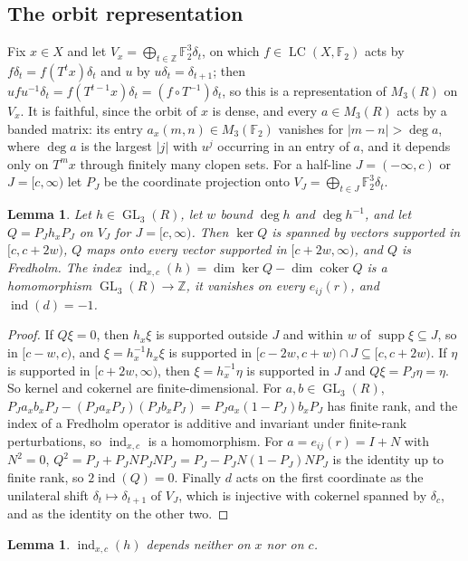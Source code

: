 \documentclass[11pt]{amsart}
\newtheorem{lemma}[theorem]{Lemma}
\theoremstyle{remark}
\newcommand{\F}{\mathbb F}
\newcommand{\Z}{\mathbb Z}
\newcommand{\LC}{\operatorname{LC}}
\newcommand{\GL}{\operatorname{GL}}
\newcommand{\ind}{\operatorname{ind}}
\newcommand{\supp}{\operatorname{supp}}
\begin{document}
\subsection*{The orbit representation}
Fix $x\in X$ and let $V_x=\bigoplus_{t\in\Z}\F_2^3\delta_t$, on which
$f\in\LC(X,\F_2)$ acts by $f\delta_t=f(T^tx)\delta_t$ and $u$ by
$u\delta_t=\delta_{t+1}$; then $ufu^{-1}\delta_t=f(T^{t-1}x)\delta_t
=(f\circ T^{-1})\delta_t$, so this is a representation of $M_3(R)$ on
$V_x$. It is faithful, since the orbit of $x$ is dense, and every
$a\in M_3(R)$ acts by a banded matrix: its entry $a_x(m,n)\in M_3(\F_2)$
vanishes for $|m-n|>\deg a$, where $\deg a$ is the largest $|j|$ with
$u^j$ occurring in an entry of $a$, and it depends only on $T^mx$ through
finitely many clopen sets. For a half-line $J=(-\infty,c)$ or $J=[c,\infty)$
let $P_J$ be the coordinate projection onto $V_J=\bigoplus_{t\in J}\F_2^3\delta_t$.

\begin{lemma}\label{lem:fredholm}
Let $h\in\GL_3(R)$, let $w$ bound $\deg h$ and $\deg h^{-1}$, and let
$Q=P_Jh_xP_J$ on $V_J$ for $J=[c,\infty)$. Then $\ker Q$ is spanned by
vectors supported in $[c,c+2w)$, $Q$ maps onto every vector supported in
$[c+2w,\infty)$, and $Q$ is Fredholm. The index
$\ind_{x,c}(h)=\dim\ker Q-\dim\operatorname{coker}Q$ is a homomorphism
$\GL_3(R)\to\Z$, it vanishes on every $e_{ij}(r)$, and $\ind(d)=-1$.
\end{lemma}

\begin{proof}
If $Q\xi=0$, then $h_x\xi$ is supported outside $J$ and within $w$ of
$\supp\xi\subseteq J$, so in $[c-w,c)$, and $\xi=h_x^{-1}h_x\xi$ is
supported in $[c-2w,c+w)\cap J\subseteq[c,c+2w)$. If $\eta$ is supported in
$[c+2w,\infty)$, then $\xi=h_x^{-1}\eta$ is supported in $J$ and
$Q\xi=P_J\eta=\eta$. So kernel and cokernel are finite-dimensional. For
$a,b\in\GL_3(R)$, $P_Ja_xb_xP_J-(P_Ja_xP_J)(P_Jb_xP_J)=P_Ja_x(1-P_J)b_xP_J$
has finite rank, and the index of a Fredholm operator is additive and
invariant under finite-rank perturbations, so $\ind_{x,c}$ is a
homomorphism. For $a=e_{ij}(r)=I+N$ with $N^2=0$,
$Q^2=P_J+P_JNP_JNP_J=P_J-P_JN(1-P_J)NP_J$ is the identity up to finite
rank, so $2\ind(Q)=0$. Finally $d$ acts on the first coordinate as the
unilateral shift $\delta_t\mapsto\delta_{t+1}$ of $V_J$, which is injective
with cokernel spanned by $\delta_c$, and as the identity on the other two.
\end{proof}

\begin{lemma}\label{lem:constant}
$\ind_{x,c}(h)$ depends neither on $x$ nor on $c$.
\end{lemma}
\end{document}
